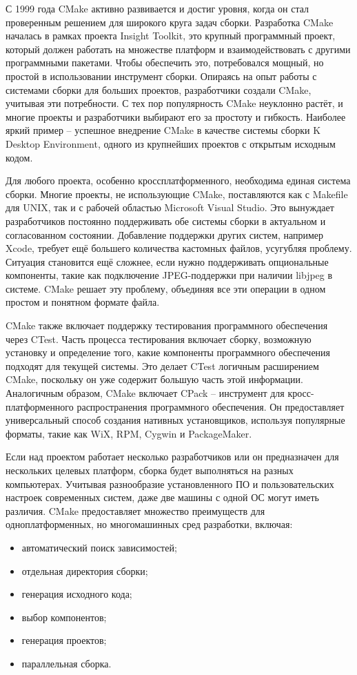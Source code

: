 С 1999 года CMake активно развивается и достиг уровня, когда он стал проверенным решением для широкого круга задач сборки. Разработка CMake началась в рамках проекта Insight Toolkit, это крупный программный проект, который должен работать на множестве платформ и взаимодействовать с другими программными пакетами. Чтобы обеспечить это, потребовался мощный, но простой в использовании инструмент сборки. Опираясь на опыт работы с системами сборки для больших проектов, разработчики создали CMake, учитывая эти потребности. С тех пор популярность CMake неуклонно растёт, и многие проекты и разработчики выбирают его за простоту и гибкость. Наиболее яркий пример -- успешное внедрение CMake в качестве системы сборки K Desktop Environment, одного из крупнейших проектов с открытым исходным кодом.

Для любого проекта, особенно кроссплатформенного, необходима единая система сборки. Многие проекты, не использующие CMake, поставляются как с Makefile для UNIX, так и с рабочей областью Microsoft Visual Studio. Это вынуждает разработчиков постоянно поддерживать обе системы сборки в актуальном и согласованном состоянии. Добавление поддержки других систем, например Xcode, требует ещё большего количества кастомных файлов, усугубляя проблему. Ситуация становится ещё сложнее, если нужно поддерживать опциональные компоненты, такие как подключение JPEG-поддержки при наличии libjpeg в системе. CMake решает эту проблему, объединяя все эти операции в одном простом и понятном формате файла.

CMake также включает поддержку тестирования программного обеспечения через CTest. Часть процесса тестирования включает сборку, возможную установку и определение того, какие компоненты программного обеспечения подходят для текущей системы. Это делает CTest логичным расширением CMake, поскольку он уже содержит большую часть этой информации. Аналогичным образом, CMake включает CPack -- инструмент для кросс-платформенного распространения программного обеспечения. Он предоставляет универсальный способ создания нативных установщиков, используя популярные форматы, такие как WiX, RPM, Cygwin и PackageMaker.

Если над проектом работает несколько разработчиков или он предназначен для нескольких целевых платформ, сборка будет выполняться на разных компьютерах. Учитывая разнообразие установленного ПО и пользовательских настроек современных систем, даже две машины с одной ОС могут иметь различия. CMake предоставляет множество преимуществ для одноплатформенных, но многомашинных сред разработки, включая:
\begin{itemize}
	\item автоматический поиск зависимостей;
	\item отдельная директория сборки;
	\item генерация исходного кода;
	\item выбор компонентов;
	\item генерация проектов;
	\item параллельная сборка.
\end{itemize}

